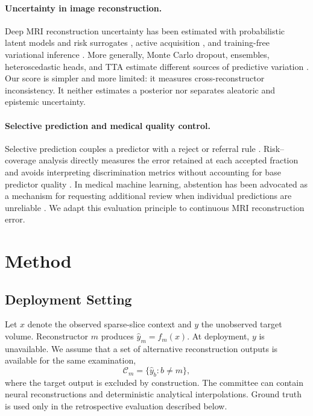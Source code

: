 \documentclass[twocolumn]{article}
\begin{document}
\paragraph{Uncertainty in image reconstruction.}
Deep MRI reconstruction uncertainty has been estimated with probabilistic latent models and risk surrogates \citep{edupuganti2021uqmri}, active acquisition \citep{zhang2019active}, and training-free variational inference \citep{zhang2024trainingfree}. More generally, Monte Carlo dropout, ensembles, heteroscedastic heads, and TTA estimate different sources of predictive variation \citep{gal2016dropout,kendall2017uncertainties,lakshminarayanan2017deepensembles,wang2018tta}. Our score is simpler and more limited: it measures cross-reconstructor inconsistency. It neither estimates a posterior nor separates aleatoric and epistemic uncertainty.

\paragraph{Selective prediction and medical quality control.}
Selective prediction couples a predictor with a reject or referral rule \citep{geifman2019selectivenet}. Risk--coverage analysis directly measures the error retained at each accepted fraction and avoids interpreting discrimination metrics without accounting for base predictor quality \citep{ding2020aurc}. In medical machine learning, abstention has been advocated as a mechanism for requesting additional review when individual predictions are unreliable \citep{kompa2021second}. We adapt this evaluation principle to continuous MRI reconstruction error.

\section{Method}

\subsection{Deployment Setting}

Let $x$ denote the observed sparse-slice context and $y$ the unobserved target volume. Reconstructor $m$ produces $\hat y_m=f_m(x)$. At deployment, $y$ is unavailable. We assume that a set of alternative reconstruction outputs is available for the same examination,
\begin{equation}
  \mathcal C_m=\{\hat y_b:b\neq m\},
\end{equation}
where the target output is excluded by construction. The committee can contain neural reconstructions and deterministic analytical interpolations. Ground truth is used only in the retrospective evaluation described below.
\end{document}
